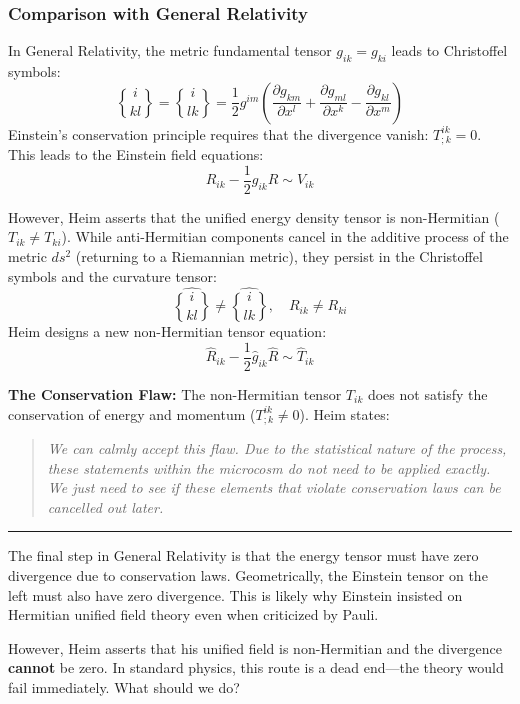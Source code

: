 \documentclass[11pt,a4paper,oneside]{article}
\newcommand{\christoffel}[2]{\genfrac{\{}{\}}{0pt}{}{#1}{#2}}
\newenvironment{fancyquote}
    {\begin{quote}\itshape\color{theoryblue!80!black}\guillemotleft\;}
    {\;\guillemotright\end{quote}}
\newcommand{\hr}{\par\vspace{2em}\noindent\rule{\linewidth}{0.4pt}\par\vspace{2em}}
\begin{document}
\subsubsection{Comparison with General Relativity}
In General Relativity, the metric fundamental tensor $g_{ik} = g_{ki}$ leads to Christoffel symbols:
\begin{equation}
    \christoffel{i}{kl} = \christoffel{i}{lk} = \frac{1}{2}g^{im} \left( \frac{\partial g_{km}}{\partial x^l} + \frac{\partial g_{ml}}{\partial x^k} - \frac{\partial g_{kl}}{\partial x^m} \right) \tag{5}
\end{equation}
Einstein's conservation principle requires that the divergence vanish: $T^{ik}_{;k} = 0$. This leads to the Einstein field equations:
\begin{equation}
    R_{ik} - \frac{1}{2}g_{ik}R \sim V_{ik} \tag{8}
\end{equation}

However, Heim asserts that the unified energy density tensor is non-Hermitian ($T_{ik} \neq T_{ki}$). While anti-Hermitian components cancel in the additive process of the metric $ds^2$ (returning to a Riemannian metric), they persist in the Christoffel symbols and the curvature tensor:
\begin{equation}
    \widehat{\christoffel{i}{kl}} \neq \widehat{\christoffel{i}{lk}}, \quad R_{ik} \neq R_{ki} \tag{11-12}
\end{equation}
Heim designs a new non-Hermitian tensor equation:
\begin{equation}
    \hat{R}_{ik} - \frac{1}{2}\hat{g}_{ik}\hat{R} \sim \hat{T}_{ik} \tag{14}
\end{equation}

\textbf{The Conservation Flaw:} The non-Hermitian tensor $T_{ik}$ does not satisfy the conservation of energy and momentum ($T^{ik}_{;k} \neq 0$). Heim states:
\begin{fancyquote}
    We can calmly accept this flaw. Due to the statistical nature of the process, these statements within the microcosm do not need to be applied exactly. We just need to see if these elements that violate conservation laws can be cancelled out later.
\end{fancyquote}

\hr

\begin{reflectionbox}[title={Reflections: The Divergence Issue}]
The final step in General Relativity is that the energy tensor must have zero divergence due to conservation laws. Geometrically, the Einstein tensor on the left must also have zero divergence. This is likely why Einstein insisted on Hermitian unified field theory even when criticized by Pauli.

However, Heim asserts that his unified field is non-Hermitian and the divergence \textbf{cannot} be zero. In standard physics, this route is a dead end—the theory would fail immediately. What should we do?
\end{reflectionbox}
\end{document}
